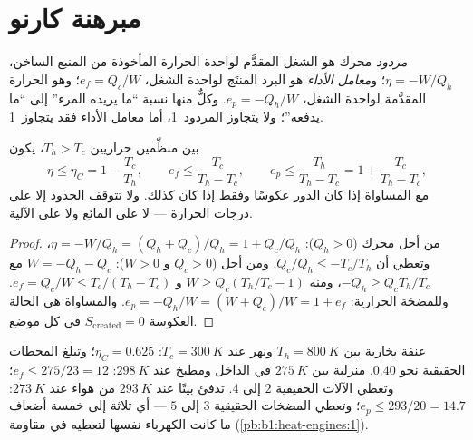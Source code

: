 \section{مبرهنة كارنو}

\begin{definition}\label{def:b1:heat-engines:efficiency}
\emph{مردود} محرك هو الشغل المقدَّم لواحدة الحرارة
المأخوذة من المنبع الساخن، $\eta = -W/Q_h$؛ و\emph{معامل
الأداء}  هو البرد
المنتَج لواحدة الشغل، $e_f = Q_c/W$؛ وهو  الحرارة
المقدَّمة لواحدة الشغل، $e_p = -Q_h/W$. وكلٌّ منها نسبة ``ما يريده
المرء'' إلى ``ما يدفعه''؛ ولا يتجاوز المردود~1، أما معامل الأداء فقد
يتجاوز~1.
\end{definition}

\begin{theorem}[كارنو]\label{thm:b1:heat-engines:carnot}
بين منظِّمين حراريين $T_h > T_c$، يكون
\[
\eta \leq \eta_C = 1 - \frac{T_c}{T_h}, \qquad
e_f \leq \frac{T_c}{T_h - T_c}, \qquad
e_p \leq \frac{T_h}{T_h - T_c} = 1 + \frac{T_c}{T_h - T_c},
\]
مع المساواة إذا كان الدور عكوسًا وفقط إذا كان كذلك. ولا تتوقف
الحدود إلا على درجات الحرارة --- لا على المائع ولا على الآلية.
\end{theorem}

\begin{proof}
من أجل محرك ($Q_h > 0$): $\eta = -W/Q_h = (Q_h + Q_c)/Q_h = 1 + Q_c/Q_h$،
وتعطي  أن $Q_c/Q_h \leq -T_c/T_h$. ومن أجل
 ($Q_c > 0$ و $W > 0$): $W = -Q_h - Q_c$ مع $-Q_h \geq Q_c T_h/T_c$،
ومنه $W \geq Q_c(T_h/T_c - 1)$ و $e_f = Q_c/W \leq T_c/(T_h - T_c)$.
وللمضخة الحرارية: $e_p = -Q_h/W = (W + Q_c)/W = 1 + e_f$. والمساواة هي
الحالة العكوسة $S_{\mathrm{created}} = 0$ في كل موضع.
\end{proof}

\begin{example}\label{ex:b1:heat-engines:numbers}
عنفة بخارية بين $T_h = \qty{800}{K}$ ونهر عند
$T_c = \qty{300}{K}$: $\eta_C = 0.625$؛ وتبلغ المحطات الحقيقية نحو $0.40$.
 منزلية بين $\qty{275}{K}$ في الداخل ومطبخ عند
$\qty{298}{K}$: $e_f \leq 275/23 = 12$؛ وتعطي الآلات الحقيقية $2$ إلى $4$.
 تدفئ بيتًا عند $\qty{293}{K}$ من هواء عند $\qty{273}{K}$:
$e_p \leq 293/20 = 14.7$؛ وتعطي المضخات الحقيقية $3$ إلى $5$ --- أي ثلاثة
إلى خمسة أضعاف ما كانت الكهرباء نفسها لتعطيه في مقاومة
(\cref{pb:b1:heat-engines:1}).
\end{example}

